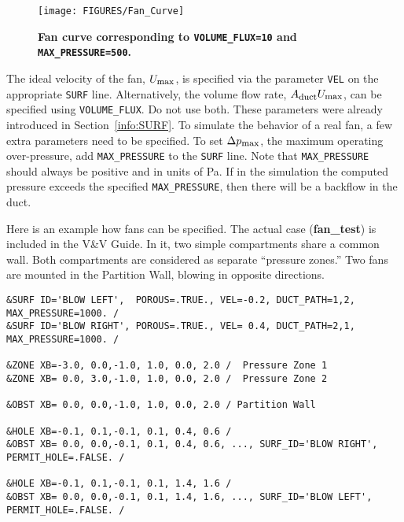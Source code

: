 \documentclass[11pt]{book}
\newcommand{\ct}{\tt\small}
\begin{document}
\begin{figure}[ht!]
\begin{center}
\texttt{[image: FIGURES/Fan\_Curve]}
\caption{\bf Fan curve corresponding to {\ct VOLUME\_FLUX=10} and {\ct MAX\_PRESSURE=500}.}
\label{fig:Fan_Curve}
\end{center}
\end{figure}

The ideal velocity of the fan, $U_{\hbox{\footnotesize max}}$, is specified via the parameter {\ct VEL} on the appropriate {\ct SURF} line. Alternatively,
the volume flow rate, $A_{\hbox{\footnotesize duct}} U_{\hbox{\footnotesize max}}$, can be specified using {\ct VOLUME\_FLUX}. Do not use both.  These parameters were
already introduced in Section~\ref{info:SURF}. To simulate the behavior of a real fan, a few extra parameters need to be specified. To set $\Delta p_{\hbox{\footnotesize max}}$,
the maximum operating over-pressure, add {\ct MAX\_PRESSURE} to the {\ct SURF} line. Note that {\ct MAX\_PRESSURE} should always be positive and in units of Pa.
If in the simulation the computed pressure exceeds the specified {\ct MAX\_PRESSURE}, then there will be a backflow in the duct.

Here is an example how fans can be specified. The actual case ({\bf fan\_test}) is included in the V\&V Guide. In it, two simple compartments share a common wall. Both
compartments are considered as separate ``pressure zones.'' Two fans are mounted in the Partition Wall, blowing in opposite directions.

\footnotesize
\begin{verbatim}
&SURF ID='BLOW LEFT',  POROUS=.TRUE., VEL=-0.2, DUCT_PATH=1,2, MAX_PRESSURE=1000. /
&SURF ID='BLOW RIGHT', POROUS=.TRUE., VEL= 0.4, DUCT_PATH=2,1, MAX_PRESSURE=1000. /

&ZONE XB=-3.0, 0.0,-1.0, 1.0, 0.0, 2.0 /  Pressure Zone 1
&ZONE XB= 0.0, 3.0,-1.0, 1.0, 0.0, 2.0 /  Pressure Zone 2

&OBST XB= 0.0, 0.0,-1.0, 1.0, 0.0, 2.0 / Partition Wall

&HOLE XB=-0.1, 0.1,-0.1, 0.1, 0.4, 0.6 /
&OBST XB= 0.0, 0.0,-0.1, 0.1, 0.4, 0.6, ..., SURF_ID='BLOW RIGHT', PERMIT_HOLE=.FALSE. /

&HOLE XB=-0.1, 0.1,-0.1, 0.1, 1.4, 1.6 /
&OBST XB= 0.0, 0.0,-0.1, 0.1, 1.4, 1.6, ..., SURF_ID='BLOW LEFT', PERMIT_HOLE=.FALSE. /
\end{verbatim}
\normalsize
\end{document}
